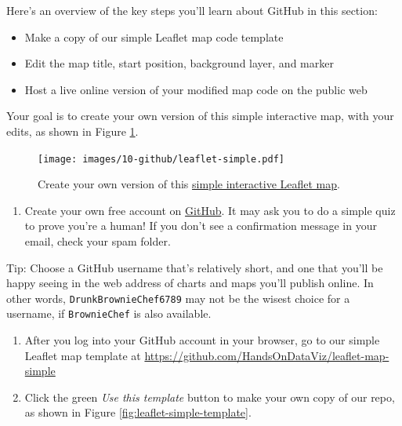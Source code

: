 \documentclass[
  english,
]{book}
\providecommand{\tightlist}{%
  \setlength{\itemsep}{0pt}\setlength{\parskip}{0pt}}
\begin{document}
Here's an overview of the key steps you'll learn about GitHub in this section:

\begin{itemize}
\tightlist
\item
  Make a copy of our simple Leaflet map code template
\item
  Edit the map title, start position, background layer, and marker
\item
  Host a live online version of your modified map code on the public web
\end{itemize}

Your goal is to create your own version of this simple interactive map, with your edits, as shown in Figure \ref{fig:leaflet-simple}.



\begin{figure}
\centering
\texttt{[image: images/10-github/leaflet-simple.pdf]}
\caption{\label{fig:leaflet-simple}Create your own version of this \href{https://handsondataviz.github.io/leaflet-map-simple/}{simple interactive Leaflet map}.}
\end{figure}

\begin{enumerate}
\def\labelenumi{\arabic{enumi}.}
\tightlist
\item
  Create your own free account on \href{https://github.com}{GitHub}. It may ask you to do a simple quiz to prove you're a human! If you don't see a confirmation message in your email, check your spam folder.
\end{enumerate}

Tip: Choose a GitHub username that's relatively short, and one that you'll be happy seeing in the web address of charts and maps you'll publish online. In other words, \texttt{DrunkBrownieChef6789} may not be the wisest choice for a username, if \texttt{BrownieChef} is also available.

\begin{enumerate}
\def\labelenumi{\arabic{enumi}.}
\setcounter{enumi}{1}
\item
  After you log into your GitHub account in your browser, go to our simple Leaflet map template at \url{https://github.com/HandsOnDataViz/leaflet-map-simple}
\item
  Click the green \emph{Use this template} button to make your own copy of our repo, as shown in Figure \ref{fig:leaflet-simple-template}.
\end{enumerate}
\end{document}
